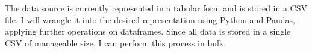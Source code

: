 \documentclass[sigconf]{acmart}
\begin{document}
The \citeauthor{untappd} data source is currently represented in a tabular form and is stored in a CSV file.
I will wrangle it into the desired representation using Python and Pandas, applying further operations on dataframes.
Since all data is stored in a single CSV of manageable size, I can perform this process in bulk.


\end{document}
